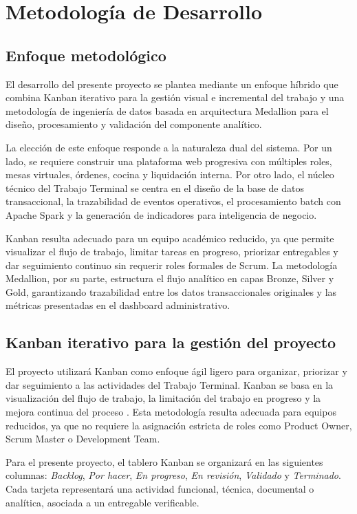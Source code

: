 \section{Metodología de Desarrollo}

\subsection{Enfoque metodológico}

El desarrollo del presente proyecto se plantea mediante un enfoque híbrido que combina
Kanban iterativo para la gestión visual e incremental del trabajo y una metodología de
ingeniería de datos basada en arquitectura Medallion para el diseño, procesamiento
y validación del componente analítico.

La elección de este enfoque responde a la naturaleza dual del sistema. Por un lado, se
requiere construir una plataforma web progresiva con múltiples roles, mesas virtuales,
órdenes, cocina y liquidación interna. Por otro lado, el núcleo técnico del Trabajo
Terminal se centra en el diseño de la base de datos transaccional, la trazabilidad de
eventos operativos, el procesamiento batch con Apache Spark y la generación de
indicadores para inteligencia de negocio.

Kanban resulta adecuado para un equipo académico reducido, ya que permite visualizar el
flujo de trabajo, limitar tareas en progreso, priorizar entregables y dar seguimiento
continuo sin requerir roles formales de Scrum. La metodología Medallion, por su parte,
estructura el flujo analítico en capas Bronze, Silver y Gold, garantizando trazabilidad
entre los datos transaccionales originales y las métricas presentadas en el dashboard
administrativo.

\subsection{Kanban iterativo para la gestión del proyecto}

El proyecto utilizará Kanban como enfoque ágil ligero para organizar, priorizar y dar
seguimiento a las actividades del Trabajo Terminal. Kanban se basa en la visualización
del flujo de trabajo, la limitación del trabajo en progreso y la mejora continua del
proceso \cite{anderson_kanban_2010}. Esta metodología resulta adecuada para equipos reducidos, ya que no requiere
la asignación estricta de roles como Product Owner, Scrum Master o Development Team.

Para el presente proyecto, el tablero Kanban se organizará en las siguientes columnas:
\textit{Backlog}, \textit{Por hacer}, \textit{En progreso}, \textit{En revisión},
\textit{Validado} y \textit{Terminado}. Cada tarjeta representará una actividad funcional,
técnica, documental o analítica, asociada a un entregable verificable.

